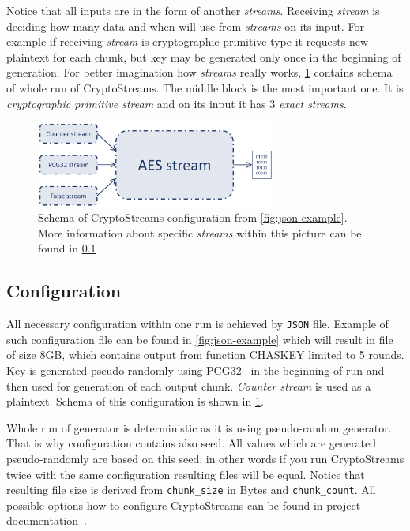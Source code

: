 \documentclass[
    digital,    %
    oneside,    %
    color,
    11pt,
    nocover,
    notable,
    nolof,
    nolot,
    final
]{fithesis3}
\begin{document}
Notice that all inputs are in the form of another \textit{streams}. Receiving \textit{stream} is deciding how many data and when will use from \textit{streams} on its input. For example if receiving \textit{stream} is cryptographic primitive type it requests new plaintext for each chunk, but key may be generated only once in the beginning of generation. For better imagination how \textit{streams} really works, \cref{fig:config-schema} contains schema of whole run of CryptoStreams. The middle block is the most important one. It is \textit{cryptographic primitive stream} and on its input it has 3 \textit{exact streams}.

\begin{figure}[h]
	\centering
	\includegraphics[width=0.7\textwidth]{./images/pictures/config-schema.png}
	\caption{Schema of CryptoStreams configuration from \cref{fig:json-example}. More information about specific \textit{streams} within this picture can be found in \cref{subsec:configuration} }
	\label{fig:config-schema}
\end{figure}


\subsection{Configuration}
\label{subsec:configuration}

All necessary configuration within one run is achieved by \texttt{JSON} file. Example of such configuration file can be found in \cref{fig:json-example} which will result in file of size 8GB, which contains output from function CHASKEY limited to 5 rounds. Key is generated pseudo-randomly using PCG32~\cite{pcgGen} in the beginning of run and then used for generation of each output chunk. \textit{Counter stream} is used as a plaintext. Schema of this configuration is shown in \cref{fig:config-schema}. 

Whole run of generator is deterministic as it is using pseudo-random generator. That is why configuration contains also seed. All values which are generated pseudo-randomly are based on this seed, in other words if you run CryptoStreams twice with the same configuration resulting files will be equal. Notice that resulting file size is derived from \texttt{chunk\_size} in Bytes and \texttt{chunk\_count}. All possible options how to configure CryptoStreams can be found in project documentation~\cite{CryptoStreams-wiki}.
\end{document}
